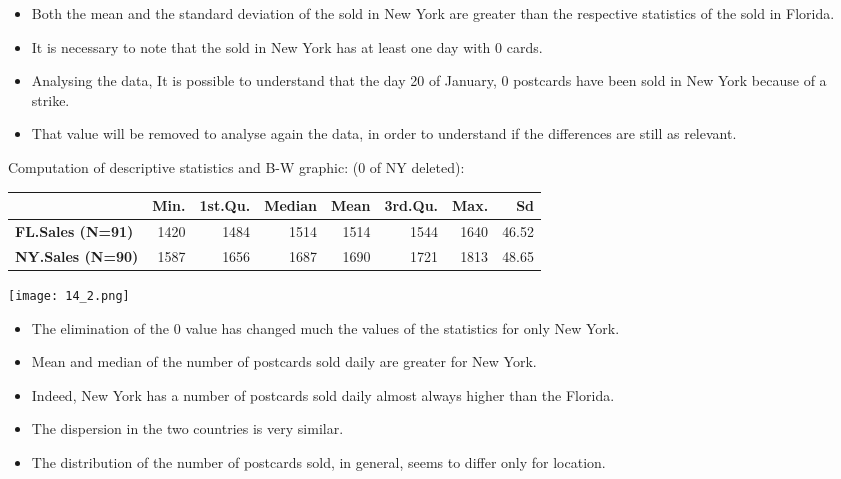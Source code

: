 \begin{frame}
\begin{itemize}
 \item Both the mean and the standard deviation of the sold in New York are greater than the respective statistics of the sold in Florida.
 \item It is necessary to note that the sold in New York has at least one day with 0 cards.
 \item Analysing the data, It is possible to understand that the day 20 of January, 0 postcards have been sold in New York because of a strike.
 \item That value will be removed to analyse again the data, in order to understand if the differences are still as relevant. 
\end{itemize}

\end{frame}

\begin{frame}
Computation of descriptive statistics and B-W graphic: (0 of NY deleted):\\
	\vspace{.3cm}
	\begin{footnotesize}
	\begin{tabular}{|l|rrrrrrr|}
	\hline
	& \textbf{Min.} & \textbf{1st.Qu.} & \textbf{Median} & \textbf{Mean} & \textbf{3rd.Qu.} & \textbf{Max.} & \textbf{Sd}\\
	\hline
	\textbf{FL.Sales (N=91)} & 1420 & 1484 & 1514 & 1514 & 1544 & 1640  & 46.52 \\
	\textbf{NY.Sales (N=90)} & 1587 & 1656 & 1687 & 1690 & 1721 & 1813 & 48.65 \\
	\hline	
	\end{tabular}
	\end{footnotesize}
	\begin{center}
		\texttt{[image: 14\_2.png]}
	\end{center}
\end{frame}

\begin{frame}
\begin{itemize}
 \item The elimination of the 0 value has changed much the values of the statistics for only New York.
 \item Mean and median of the number of postcards sold daily are greater for New York.
 \item Indeed, New York has a number of postcards sold daily almost always higher than the Florida.
 \item The dispersion in the two countries is very similar.
 \item The distribution of the number of postcards sold, in general, seems to differ only for location.
\end{itemize}

\end{frame}

